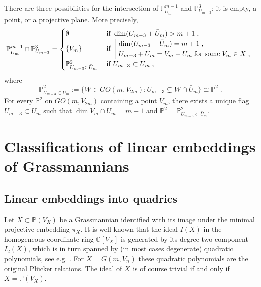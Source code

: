 \documentclass[12pt]{amsart}
\def\CC {{\mathbb C}}     %
\def\PP {{\mathbb P}}     %
\begin{document}
There are three possibilities for the intersection of $\PP^{m-1}_{\bar U_{m}}$ and $\PP^{3}_{U_{m-3}}$: it is empty, a point, or a projective plane. More precisely,
$$
\PP^{m-1}_{\bar U_{m}}\cap\PP^{3}_{U_{m-3}} = \begin{cases} \emptyset & \;{\rm if}\; \dim (U_{m-3}+  \bar U_{m})>m+1 \;, \\ \{V_m\} & \;{\rm if}\;\; \begin{array}{|l} \dim (U_{m-3}+ \bar U_{m})= m+1\;,\\ U_{m-3}+ \bar U_{m}=V_m+\bar U_{m}\;\textrm{for some}\; V_m\in X\;,\end{array} \\ \PP^2_{U_{m-3}\subset \bar U_{m}}& \;{\rm if}\; U_{m-3}\subset \bar U_{m}\;,\end{cases}
$$
where
$$
\PP^2_{U_{m-3}\subset \bar U_{m}} := \{W\in GO(m,V_{2m}) : U_{m-3}\subsetneq  W\cap \bar U_{m} \} \cong \PP^2 \;.
$$
For every $\PP^2$ on $GO(m,V_{2m})$ containing a point $V_m$, there exists a unique flag $U_{m-3}\subset \bar U_{m}$ such that $\dim V_m\cap \bar U_m=m-1$ and $\PP^2=\PP^2_{U_{m-3}\subset \bar U_{m}}$. 


\section{Classifications of linear embeddings of Grassmannians}\label{Sec Lin Emb Grass}


\subsection{Linear embeddings into quadrics}

Let $X\subset \PP(V_X)$ be a Grassmannian identified with its image under the minimal projective embedding $\pi_X$. It is well known that the ideal $I(X)$ in the homogeneous coordinate ring $\CC[V_X]$ is generated by its degree-two component $I_2(X)$, which is in turn spanned by (in most cases degenerate) quadratic polynomials, see e.g. \cite[Theorem 16.2.2.6]{Landsberg-2012-book}. For $X=G(m,V_n)$ these quadratic polynomials are the original Pl\"ucker relations. The ideal of $X$ is of course trivial if and only if $X=\PP(V_X)$.
\end{document}

